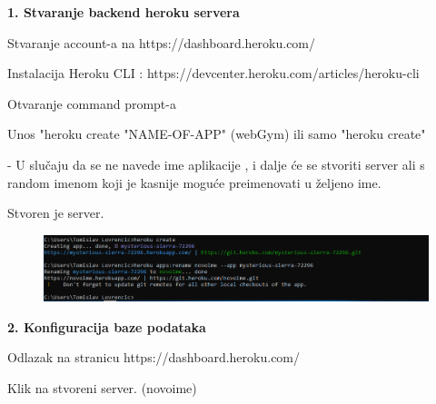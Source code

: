 		    \begin{packed_item}
						\item  \textbf{1. Stvaranje backend heroku servera} 
						\item[] \begin{packed_enum}
	
							\item Stvaranje account-a na https://dashboard.heroku.com/
							
							\item Instalacija Heroku CLI : https://devcenter.heroku.com/articles/heroku-cli
							
							\item Otvaranje command prompt-a
							
							\item Unos "heroku create "NAME-OF-APP" (webGym) ili samo "heroku create"
							
							    - U slučaju da se ne navede ime aplikacije , i dalje će se stvoriti server ali s random imenom koji je kasnije moguće preimenovati u željeno ime.
							
							\item Stvoren je server.
							    
							    \begin{figure}[H]
                        			\hspace*{-1.5cm}
                        			\includegraphics[scale=0.5]{dijagrami/cmd.PNG} %
                        			\centering
                        			\label{fig:promjene}
                        		\end{figure}

						\end{packed_enum}
						\item  \textbf{2. Konfiguracija baze podataka} 
						\item[] \begin{packed_enum}
	
							\item Odlazak na stranicu  https://dashboard.heroku.com/
							
							\item Klik na stvoreni server. (novoime)
							

\end{packed_enum}
\end{packed_item}
